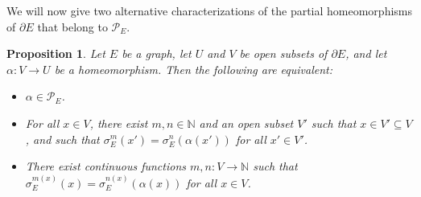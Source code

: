 \documentclass[12pt, a4paper]{amsart}
\numberwithin{equation}{section}
\newtheorem{prop}[thm]{Proposition}
\theoremstyle{definition}
\theoremstyle{remark}
\begin{document}
We will now give two alternative characterizations of the partial 
homeomorphisms of $\partial E$ that belong to $\mathcal{P}_E$.

\begin{prop} \label{prop:pseudo}
	Let $E$ be a graph, let $U$ and $V$ be open subsets of $\partial E$, and 
	let $\alpha:V\to U$ be a homeomorphism. Then the following are equivalent:
	\begin{itemize}
	\item[(1)] $\alpha\in\mathcal{P}_E$.
	\item[(2)] For all $x\in V$, there exist $m,n\in{\mathbb{N}}$ and an open subset 
	$V'$ such that $x\in V'\subseteq V$, and such that 
	$\sigma_E^m(x')=\sigma_E^n(\alpha(x'))$ for all $x'\in V'$.
	\item[(3)] There exist continuous functions $m,n:V\to{\mathbb{N}}$ such that 
	$\sigma_E^{m(x)}(x)=\sigma_E^{n(x)}(\alpha(x))$ for all $x\in V$.
	\end{itemize}
\end{prop}
\end{document}
